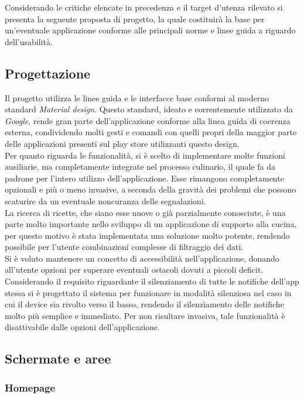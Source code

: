 Considerando le critiche elencate in precedenza e il target d'utenza rilevato si
presenta la seguente proposta di progetto, la quale costituirà la base per
un'eventuale applicazione conforme alle principali norme e linee guida a
riguardo dell'usabilità.

\subsection{Progettazione}
Il progetto utilizza le linee guida e le interfacce base conformi al moderno
standard \emph{Material design}.  Questo standard, ideato e correntemente
utilizzato da \emph{Google}, rende gran parte dell'applicazione conforme alla
linea guida di coerenza esterna, condividendo molti gesti e comandi con quelli
propri della maggior parte delle applicazioni presenti sul play store
utilizzanti questo design.\\
Per quanto riguarda le funzionalità, si è scelto di implementare
molte funzioni ausiliarie, ma completamente integrate nel processo
culinario, il quale fa da padrone per l'intero utilizzo dell'applicazione.  Esse
rimangono completamente opzionali e più o meno invasive, a seconda della gravità
dei problemi che possono scaturire da un eventuale noncuranza delle
segnalazioni.\\
La ricerca di ricette, che siano esse nuove o già parzialmente conosciute, è una
parte molto importante nello sviluppo di un applicazione di supporto alla
cucina, per questo motivo è stata implementata una soluzione molto potente, rendendo
possibile per l'utente combinazioni complesse di filtraggio dei dati.\\
Si è voluto mantenere un concetto di accessibilità nell'applicazione, donando
all'utente opzioni per superare eventuali ostacoli dovuti a piccoli deficit.\\
Considerando il requisito riguardante il silenziamento di tutte le notifiche
dell'app stessa si è progettato il sistema per funzionare in modalità silenziosa
nel caso in cui il device sia rivolto verso il basso, rendendo il silenziamento
delle notifiche molto più semplice e immediato.  Per non risultare invasiva,
tale funzionalità è disattivabile dalle opzioni dell'applicazione.
\subsection{Schermate e aree}
\subsubsection{Homepage}
